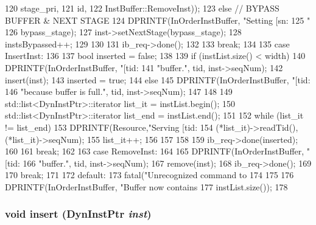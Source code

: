 \begin{DoxyCode}
{{{{120                                                       stage_pri,
121                                                       id,
122                                                       InstBuffer::RemoveInst));
123             } else {         // BYPASS BUFFER & NEXT STAGE
124                 DPRINTF(InOrderInstBuffer, "Setting [sn:%
125                         "%
126                         bypass_stage);
127                 inst->setNextStage(bypass_stage);
128                 instsBypassed++;
129             }
130 
131             ib_req->done();
132         }
133         break;
134 
135       case InsertInst:
136         {
137             bool inserted = false;
138 
139             if (instList.size() < width) {
140                 DPRINTF(InOrderInstBuffer, "[tid:%
141                         "buffer.\n", tid, inst->seqNum);
142                 insert(inst);
143                 inserted = true;
144             } else {
145                 DPRINTF(InOrderInstBuffer, "[tid:%
146                         "because buffer is full.\n", tid, inst->seqNum);
147 
148 
149                 std::list<DynInstPtr>::iterator list_it = instList.begin();
150                 std::list<DynInstPtr>::iterator list_end = instList.end();
151 
152                 while (list_it != list_end) {
153                     DPRINTF(Resource,"Serving [tid:%
154                             (*list_it)->readTid(), (*list_it)->seqNum);
155                     list_it++;
156                 }
157             }
158 
159             ib_req->done(inserted);
160         }
161         break;
162 
163       case RemoveInst:
164         {
165             DPRINTF(InOrderInstBuffer, "[tid:%
166                     "buffer.\n", tid, inst->seqNum);
167             remove(inst);
168             ib_req->done();
169         }
170         break;
171 
172       default:
173         fatal("Unrecognized command to %
174     }
175 
176     DPRINTF(InOrderInstBuffer, "Buffer now contains %
177             instList.size());
178 }
\end{DoxyCode}
\hypertarget{classInstBuffer_ae55039f80e321715cf410a62b39d069c}{
\subsubsection[{insert}]{\setlength{\rightskip}{0pt plus 5cm}void insert ({\bf DynInstPtr} {\em inst})}}
\label{classInstBuffer_ae55039f80e321715cf410a62b39d069c}



